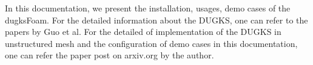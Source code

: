 In this documentation, we present the installation, usages, demo cases of the dugksFoam.
For the detailed information about the DUGKS, one can refer to the papers by Guo et al\cite{guozl13,guozl15}.
For the detailed of implementation of the DUGKS in unstructured mesh and the configuration of demo cases in this documentation,
one can refer the paper post on arxiv.org by the author\cite{zhulh15}.

\endinput
%

